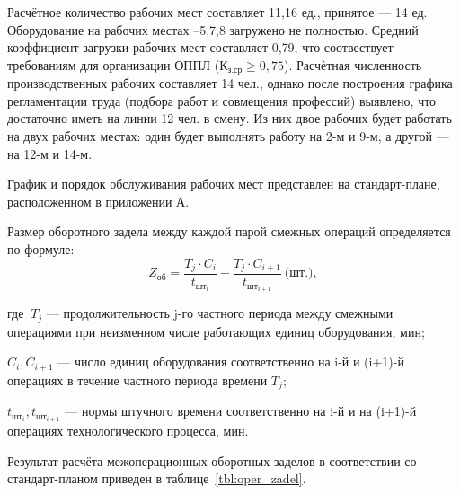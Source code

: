 Расчётное количество рабочих мест составляет 11{,}16 ед.,
принятое --- 14 ед.
Оборудование на рабочих местах \textnumero {}--5,7,8 
загружено не полностью.
Средний коэффициент загрузки рабочих мест составляет 0{,}79, что соотвествует
требованиям для организации ОППЛ (\( \text{К}_{\text{з.ср}} \ge 0{,}75 \)).
Расчѐтная численность производственных рабочих составляет 14 чел.,
однако после построения графика регламентации труда
(подбора работ и совмещения профессий) выявлено, что достаточно
иметь на линии 12 чел. в смену.
Из них двое рабочих будет работать на двух рабочих местах:
один будет выполнять работу на 2-м и 9-м, а другой --- на 12-м и 14-м.

График и порядок обслуживания рабочих мест представлен на стандарт-плане,
расположенном в приложении А.

Размер оборотного задела между каждой парой смежных операций определяется 
по формуле:
\begin{equation*}
  Z_{\text{об}} = 
  \dfrac{T_j \cdot C_i}{t_{\text{шт}_i}} - \dfrac{T_j \cdot C_{i+1}}{t_{\text{шт}_{i+1}}} 
  \: \text{(шт.)},
\end{equation*}

\noindent где \( \: T_j \) --- продолжительность j-го частного периода между
смежными операциями при неизменном числе работающих единиц оборудования, мин;

\( C_i, C_{i+1} \) --- число единиц оборудования соответственно на i-й и 
(i+1)-й операциях в течение частного периода времени \( T_j \);

\( t_{\text{шт}_i}, t_{\text{шт}_{i+1}}\) --- нормы штучного времени соответственно на
i-й и на (i+1)-й операциях технологического процесса, мин.

Результат расчёта межоперационных оборотных заделов в соответствии со 
стандарт-планом приведен в таблице~\ref{tbl:oper_zadel}.

